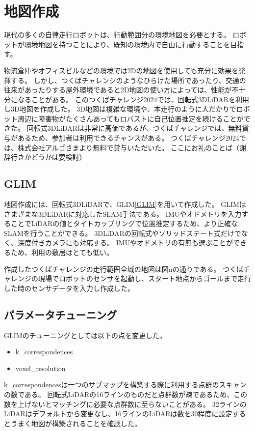 \section{地図作成}
現代の多くの自律走行ロボットは、行動範囲分の環境地図を必要とする。
ロボットが環境地図を持つことにより、既知の環境内で自由に行動することを目指す。

物流倉庫やオフィスビルなどの環境では2Dの地図を使用しても充分に効果を発揮する。
しかし、つくばチャレンジのようなひらけた場所であったり、交通の往来があったりする屋外環境であると2D地図の使い方によっては、性能が不十分になることがある。
このつくばチャレンジ2024では、回転式3DLiDARを利用し3D地図を作成した。
3D地図は複雑な環境や、本走行のように人だかりでロボット周辺に障害物がたくさんあってもロバストに自己位置推定を続けることができた。
回転式3DLiDARは非常に高価であるが、つくばチャレンジでは、無料貸与があるため、参加者は利用できるチャンスがある。
つくばチャレンジ2024では、株式会社アルゴさまより無料で貸与いただいた。
ここにお礼のことば（謝辞行きかどうかは要検討）

\subsection{GLIM}
地図作成には、回転式3DLiDARで、GLIM\ref{GLIM}を用いて作成した。
GLIMはさまざまな3DLiDARに対応したSLAM手法である。
IMUやオドメトリを入力することでLiDARの値とタイトカップリングで位置推定するため、より正確なSLAMを行うことができる。
3DLiDARの回転式やソリッドステート式だけでなく、深度付きカメラにも対応する。
IMUやオドメトリの有無も選ぶことができるため、利用の敷居はとても低い。

作成したつくばチャレンジの走行範囲全域の地図は図nの通りである。
つくばチャレンジの現場でロボットのセンサを起動し、スタート地点からゴールまで走行した時のセンサデータを入力し作成した。

\subsection{パラメータチューニング}
GLIMのチューニングとしては以下の点を変更した。
\begin{itemize}
    \item k\_correspondences
    \item voxel\_resolution
\end{itemize}

k\_correspondencesは一つのサブマップを構築する際に利用する点群のスキャンの数である。
回転式LiDARの16ラインのものだと点群数が疎であるため、この数を上げないとマッチングに必要な点群数に至らないことがある。
32ラインのLiDARはデフォルトから変更なし、16ラインのLiDARは数を30程度に設定するとうまく地図が構築されることを確認した。

